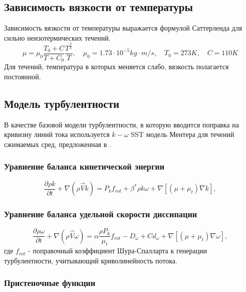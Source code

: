 \documentclass[pdftex,a4paper,12pt]{article}
\begin{document}
			\subsection{Зависимость вязкости от температуры}
				\hspace{2em}Зависимость вязкости от температуры выражается формулой Саттерленда для сильно неизотермических течений.
				\begin{equation}
					\mu = \mu_0 \frac{T_0 + C}{T + C_0} \frac{T^{\frac{3}{2}}}{T}, \quad \mu_0 = 1.73 \cdot 10^{-5} kg \cdot m/s, \quad T_0 = 273K, \quad C=110 K
				\end{equation}
				Для течений, температура в которых меняется слабо, вязкость полагается постоянной.
	\newpage
	\subsection{Модель турбулентности}
		\hspace{2em}В качестве базовой модели турбулентности, в которую вводится поправка на кривизну линий тока используется $k-\omega$ SST модель Ментера для течений сжимаемых сред, предложенная в \cite{Menter}.
		\subsubsection{Уравнение баланса кинетической энергии}
				\begin{equation}
				\frac{\partial \rho k}{\partial t} + \nabla{(\rho \vec{V} k)} = P_k f_{rot} + \beta^* \rho k \omega + \nabla{\left[(\mu + \mu_t) \nabla k\right]},
				\end{equation}
		\subsubsection{Уравнение баланса удельной скорости диссипации}
			\begin{equation}
				\frac{\partial \rho \omega}{\partial t} + \nabla{(\rho \vec{V} \omega)} = \alpha \frac{\rho P_k }{\mu_t}f_{rot} -D_{\omega} + Cd_{\omega} + \nabla{\left[(\mu + \mu_t) \nabla \omega\right]},
			\end{equation}
			где $f_{rot}$ - поправочный коэффициент Шура-Спалларта к генерации турбулентности, учитывающий криволинейность потока.
			\subsubsection{Пристеночные функции}
	\newpage
\end{document}
